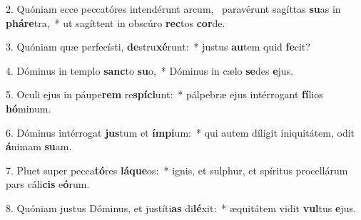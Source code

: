 2. Quóniam ecce peccatóres intendérunt arcum, \dag\  paravérunt sagíttas \textbf{su}as in \textbf{phá}\textbf{re}tra,~*  ut sagíttent in obscúro \textbf{rec}tos \textbf{cor}de.\

3. Quóniam quæ perfecísti, \textbf{de}stru\textbf{xé}runt:~*  justus \textbf{au}tem quid \textbf{fe}cit?\

4. Dóminus in templo \textbf{sanc}to \textbf{su}o,~*  Dóminus in cælo \textbf{se}des \textbf{e}jus.\

5. Oculi ejus in páupe\textbf{rem} re\textbf{spí}\textbf{ci}unt:~*  pálpebræ ejus intérrogant \textbf{fí}lios \textbf{hó}minum.\

6. Dóminus intérrogat \textbf{jus}tum et \textbf{ím}\textbf{pi}um:~*  qui autem díligit iniquitátem, odit \textbf{á}nimam \textbf{su}am.\

7. Pluet super pecca\textbf{tó}res \textbf{lá}\textbf{que}os:~*  ignis, et sulphur, et spíritus procellárum pars cáli\textbf{cis} e\textbf{ó}rum.\

8. Quóniam justus Dóminus, et justíti\textbf{as} di\textbf{lé}xit:~*  æquitátem vidit \textbf{vul}tus \textbf{e}jus.\

